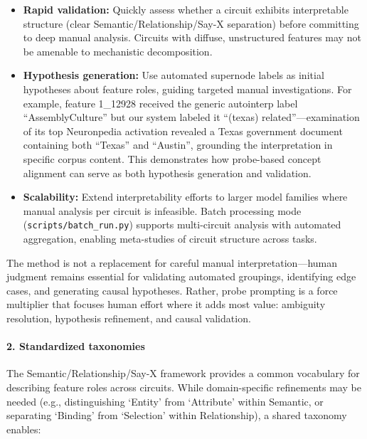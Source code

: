 \begin{itemize}
  \item \textbf{Rapid validation:} Quickly assess whether a circuit exhibits interpretable structure (clear Semantic/Relationship/Say-X separation) before committing to deep manual analysis. Circuits with diffuse, unstructured features may not be amenable to mechanistic decomposition.
  
  \item \textbf{Hypothesis generation:} Use automated supernode labels as initial hypotheses about feature roles, guiding targeted manual investigations. For example, feature 1\_12928 received the generic autointerp label ``AssemblyCulture'' but our system labeled it ``(texas) related''---examination of its top Neuronpedia activation revealed a Texas government document containing both ``Texas'' and ``Austin'', grounding the interpretation in specific corpus content. This demonstrates how probe-based concept alignment can serve as both hypothesis generation and validation.
  
  \item \textbf{Scalability:} Extend interpretability efforts to larger model families where manual analysis per circuit is infeasible. Batch processing mode (\texttt{scripts/batch\_run.py}) supports multi-circuit analysis with automated aggregation, enabling meta-studies of circuit structure across tasks.
\end{itemize}

The method is not a replacement for careful manual interpretation---human judgment remains essential for validating automated groupings, identifying edge cases, and generating causal hypotheses. Rather, probe prompting is a force multiplier that focuses human effort where it adds most value: ambiguity resolution, hypothesis refinement, and causal validation.

\paragraph{2. Standardized taxonomies}
The Semantic/Relationship/Say-X framework provides a common vocabulary for describing feature roles across circuits. While domain-specific refinements may be needed (e.g., distinguishing `Entity' from `Attribute' within Semantic, or separating `Binding' from `Selection' within Relationship), a shared taxonomy enables:

